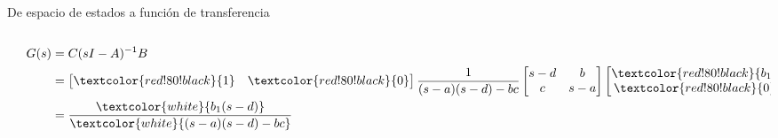 \documentclass[presentation,aspectratio=1610]{beamer}
\begin{document}
\begin{frame}[label={sec:org9808ef5}]{De espacio de estados a función de transferencia}
\begin{columns}
\begin{column}{0.5\columnwidth}
\pause
\end{column}

\begin{column}{0.5\columnwidth}
\begin{align*}
G(s) &= C(sI-A)^{-1}B\\
     &= \begin{bmatrix} \textcolor{red!80!black}{1} &  \textcolor{red!80!black}{0}\end{bmatrix} \frac{1}{(s-a)(s-d) - bc} \begin{bmatrix} s-d & b\\c & s-a \end{bmatrix} \begin{bmatrix} \textcolor{red!80!black}{b_1} \\ \textcolor{red!80!black}{0} \end{bmatrix}\\
    &=  \frac{\textcolor{white}{b_1(s-d)}}{\textcolor{white}{(s-a)(s-d) - bc}}
\end{align*}
\end{column}
\end{columns}
\end{frame}
\end{document}
